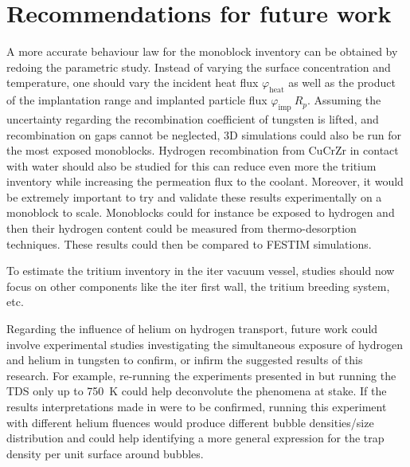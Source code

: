 \section*{Recommendations for future work}

A more accurate behaviour law for the monoblock inventory can be obtained by redoing the parametric study.
Instead of varying the surface concentration and temperature, one should vary the incident heat flux $\varphi_\mathrm{heat}$ as well as the product of the implantation range and implanted particle flux $\varphi_\mathrm{imp} \ R_p$.
Assuming the uncertainty regarding the recombination coefficient of tungsten is lifted, and recombination on gaps cannot be neglected, 3D simulations could also be run for the most exposed monoblocks.
Hydrogen recombination from CuCrZr in contact with water should also be studied for this can reduce even more the tritium inventory while increasing the \gls{permeation} flux to the coolant.
Moreover, it would be extremely important to try and validate these results experimentally on a monoblock to scale.
Monoblocks could for instance be exposed to hydrogen and then their hydrogen content could be measured from thermo-desorption techniques.
These results could then be compared to FESTIM simulations.

To estimate the tritium inventory in the \gls{iter} vacuum vessel, studies should now focus on other components like the \gls{iter} \gls{first wall}, the tritium breeding system, etc.

Regarding the influence of helium on hydrogen transport, future work could involve experimental studies investigating the simultaneous exposure of hydrogen and helium in tungsten to confirm, or infirm the suggested results of this research.
For example, re-running the experiments presented in  but running the TDS only up to \SI{750}{K} could help deconvolute the phenomena at stake.
If the results interpretations made in  were to be confirmed, running this experiment with different helium fluences would produce different bubble densities/size distribution and could help identifying a more general expression for the trap density per unit surface around bubbles.
